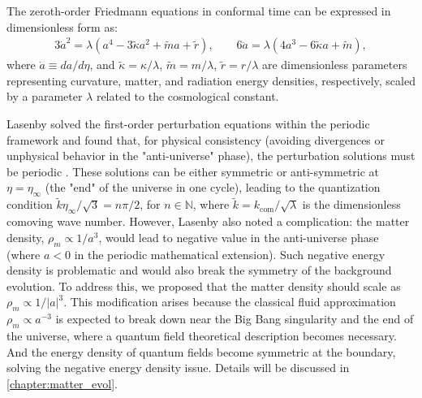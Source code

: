 The zeroth-order Friedmann equations in conformal time can be expressed in dimensionless form as: %
\begin{equation}\label{eq:friedmann_eq}
\begin{aligned}
    3\dot{a}^2 = \lambda (a^4 - 3\tilde\kappa a^2  + \tilde ma+\tilde r), \qquad
    6\ddot{a} = \lambda(4a^3-6\tilde\kappa a+\tilde m),
\end{aligned}
\end{equation}
where $\dot{a} \equiv da/d\eta$, and $\tilde{\kappa} = \kappa/\lambda$, $\tilde{m} = m/\lambda$, $\tilde{r} = r/\lambda$ are dimensionless parameters representing curvature, matter, and radiation energy densities, respectively, scaled by a parameter $\lambda$ related to the cosmological constant. %

Lasenby solved the first-order perturbation equations within the periodic framework and found that, for physical consistency (avoiding divergences or unphysical behavior in the "anti-universe" phase), the perturbation solutions must be periodic \cite{2022PhRvD.105h3514L}. %
These solutions can be either symmetric or anti-symmetric at $\eta=\eta_\infty$ (the "end" of the universe in one cycle), leading to the quantization condition $\tilde k\eta_\infty/\sqrt{3}=n\pi/2$, for $n \in \mathbb{N}$, where $\tilde k = k_{\mathrm{com}}/\sqrt{\lambda}$ is the dimensionless comoving wave number. %
However, Lasenby also noted a complication: the matter density, $\rho_m \propto 1/a^{3}$, would lead to negative value in the anti-universe phase (where $a<0$ in the periodic mathematical extension). %
Such negative energy density is problematic and would also break the symmetry of the background evolution. %
To address this, we proposed that the matter density should scale as $\rho_m \propto 1/|a|^3$. This modification arises because the classical fluid approximation $\rho_m \propto a^{-3}$ is expected to break down near the Big Bang singularity and the end of the universe, where a quantum field theoretical description becomes necessary. And the energy density of quantum fields become symmetric at the boundary, solving the negative energy density issue. Details will be discussed in \cref{chapter:matter_evol}.


